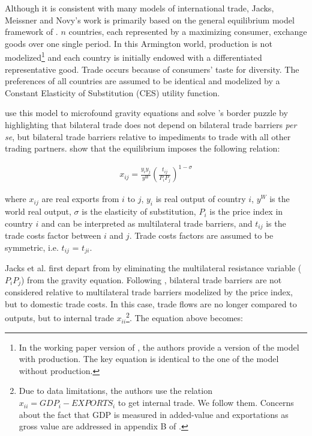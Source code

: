 \documentclass{article}
\begin{document}
Although it is consistent with many models of international
trade, Jacks, Meissner and Novy's work is primarily based on
the general equilibrium model framework of \cite{AW2003}. $n$
countries, each represented by a maximizing consumer, exchange
goods over one single period. In this Armington world,
production is not modelized\footnote{In the working paper
version of \cite{JMN2010}, the authors provide a version of the
model with production. The key equation is identical to the one
of the model without production.} and each country is initially
endowed with a differentiated representative good. Trade occurs
because of consumers' taste for diversity. The preferences of
all countries are assumed to be identical and modelized by a
Constant Elasticity of Substitution (CES) utility function.

\cite{AW2003} use this model to microfound gravity equations
and solve \cite{MAC}'s border puzzle by highlighting that
bilateral trade does not depend on bilateral trade barriers \textit{per
se}, but bilateral trade barriers relative to impediments to
trade with all other trading partners. \cite{AW2003} show that the
equilibrium imposes the following relation:

\begin{eqnarray}
x_{ij}=\frac{y_i y_j}{y^W}\left(\frac{t_{ij}}{P_i P_j}\right)^{1-\sigma}
\end{eqnarray}

where $x_{ij}$ are real exports from $i$ to $j$, $y_i$ is real
output of country $i$, $y^W$ is the world real output, $\sigma$
is the elasticity of substitution, $P_i$ is the price index in
country $i$ and can be interpreted as multilateral trade
barriers, and $t_{ij}$ is the trade costs factor between $i$
and $j$. Trade costs factors are assumed to be symmetric, i.e.
$t_{ij}$ = $t_{ji}$.

Jacks et al. first depart from \cite{AW2003} by eliminating the
multilateral resistance variable ($P_i P_j$) from the gravity equation.
Following \cite{NOVY}, bilateral trade barriers are not
considered relative to multilateral trade barriers modelized by
the price index, but to domestic trade costs. In this case,
trade flows are no longer compared to outputs, but to internal
trade $x_{ii}$\footnote{Due to data limitations, the authors
use the relation $x_{ii}=GDP_i-EXPORTS_i$ to get internal
trade. We follow them. Concerns about the fact that GDP is
measured in added-value and exportations as gross value are
addressed in appendix B of \cite{JMN2011}.}. The equation above
becomes:
\end{document}
